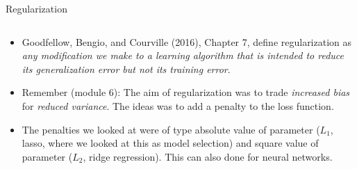 \documentclass[10pt,ignorenonframetext,]{beamer}
\providecommand{\tightlist}{%
  \setlength{\itemsep}{0pt}\setlength{\parskip}{0pt}}
\begin{document}
\begin{frame}

\begin{block}{Regularization}

\(~\)

\begin{itemize}
\tightlist
\item
  Goodfellow, Bengio, and Courville (2016), Chapter 7, define
  regularization as \emph{any modification we make to a learning
  algorithm that is intended to reduce its generalization error but not
  its training error}.
\end{itemize}

\vspace{2mm}

\begin{itemize}
\tightlist
\item
  Remember (module 6): The aim of regularization was to trade
  \emph{increased bias} for \emph{reduced variance}. The ideas was to
  add a penalty to the loss function.
\end{itemize}

\vspace{2mm}

\begin{itemize}
\tightlist
\item
  The penalties we looked at were of type absolute value of parameter
  (\(L_1\), lasso, where we looked at this as model selection) and
  square value of parameter (\(L_2\), ridge regression). This can also
  done for neural networks.
\end{itemize}

\vspace{2mm}

\end{block}

\end{frame}
\end{document}

